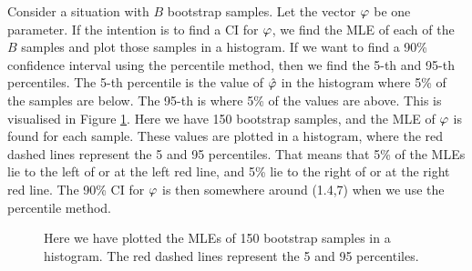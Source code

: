 Consider a situation with $B$ bootstrap samples. Let the vector $\varphi$ be one parameter. If the intention is to find a CI for $\varphi$, we find the MLE of each of the $B$ samples and plot those samples in a histogram. If we want to find a 90\% confidence interval using the percentile method, then we find the 5-th and 95-th percentiles. The 5-th percentile is the value of $\hat{\varphi}$ in the histogram where 5\% of the samples are below. The 95-th is where 5\% of the values are above. This is visualised in Figure \ref{percentile_ci_example}. Here we have 150 bootstrap samples, and the MLE of $\varphi$ is found for each sample. These values are plotted in a histogram, where the red dashed lines represent the 5 and 95 percentiles. That means that 5\% of the MLEs lie to the left of or at the left red line, and 5\% lie to the right of or at the right red line. The 90\% CI for $\varphi$ is then somewhere around (1.4,7) when we use the percentile method.
\begin{figure}
    \centering
    
    \caption[Bootstrap Example]{Here we have plotted the MLEs of 150 bootstrap samples in a histogram. The red dashed lines represent the 5 and 95 percentiles.}
    \label{percentile_ci_example}
\end{figure}

